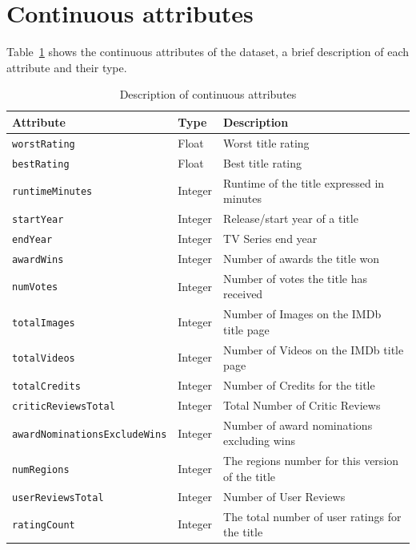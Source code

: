 \section{Continuous attributes}
Table~\ref{tab:numerical_attributes} shows the continuous attributes of the dataset,
a brief description of each attribute and their type.
\begin{table}[h]
    \centering
    \begin{tabular}{|l|l|l|} %
        \hline
        \textbf{Attribute} & \textbf{Type} & \textbf{Description} \\ 
        \hline
        \texttt{worstRating} & Float & Worst title rating \\ 
        \hline
        \texttt{bestRating} & Float & Best title rating \\ 
        \hline
        \texttt{runtimeMinutes} & Integer & Runtime of the title expressed in minutes \\ 
        \hline
        \texttt{startYear} & Integer & Release/start year of a title \\ 
        \hline
        \texttt{endYear} & Integer & TV Series end year \\
        \hline
        \texttt{awardWins} & Integer & Number of awards the title won \\ 
        \hline
        \texttt{numVotes} & Integer & Number of votes the title has received \\ 
        \hline
        \texttt{totalImages} & Integer & Number of Images on the IMDb title page \\ 
        \hline
        \texttt{totalVideos} & Integer & Number of Videos on the IMDb title page \\ 
        \hline
        \texttt{totalCredits} & Integer & Number of Credits for the title \\ 
        \hline
        \texttt{criticReviewsTotal} & Integer & Total Number of Critic Reviews \\ 
        \hline
        \texttt{awardNominationsExcludeWins} & Integer & Number of award nominations excluding wins \\ 
        \hline
        \texttt{numRegions} & Integer & The regions number for this version of the title \\ 
        \hline
        \texttt{userReviewsTotal} & Integer & Number of User Reviews \\ 
        \hline
        \texttt{ratingCount} & Integer & The total number of user ratings for the title \\ 
        \hline
    \end{tabular}
    \caption{Description of continuous attributes}
    \label{tab:numerical_attributes}
\end{table}



